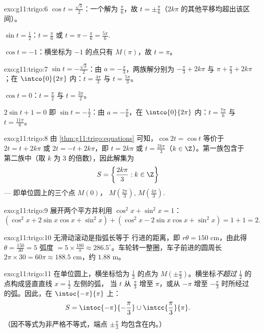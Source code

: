 \begin{solution}{exo:g11:trigo:6}
$\cos t = \frac{\sqrt3}{2}$：一个解为 $\frac\pi6$，故
$t = \pm\frac\pi6$（$2k\pi$ 的其他平移均超出该区间）。

$\sin t = \frac12$：$t = \frac\pi6$ 或 $t = \pi - \frac\pi6 =
\frac{5\pi}{6}$.

$\cos t = -1$：横坐标为 $-1$ 的点只有 $M(\pi)$，故 $t = \pi$。
\end{solution}

\begin{solution}{exo:g11:trigo:7}
$\sin t = -\frac{\sqrt3}{2}$：由 $a = -\frac\pi3$，两族解分别为
$-\frac\pi3 + 2k\pi$ 与 $\pi + \frac\pi3 + 2k\pi$；在
$\intco{0}{2\pi}$ 内：$t = \frac{4\pi}{3}$ 与 $t = \frac{5\pi}{3}$。

$\cos t = 0$：$t = \frac\pi2$ 与 $t = \frac{3\pi}{2}$。

$2\sin t + 1 = 0$ 即 $\sin t = -\frac12$：由 $a = -\frac\pi6$，在
$\intco{0}{2\pi}$ 内：$t = \frac{7\pi}{6}$ 与 $t = \frac{11\pi}{6}$。
\end{solution}

\begin{solution}{exo:g11:trigo:8}
由 \cref{thm:g11:trigo:equations} 可知，$\cos 2t = \cos t$ 等价于
$2t = t + 2k\pi$ 或 $2t = -t + 2k\pi$，即 $t = 2k\pi$ 或
$t = \frac{2k\pi}{3}$（$k \in \Z$）。第一族包含于
第二族中（取 $k$ 为 $3$ 的倍数），因此解集为
\[
S = \left\{\frac{2k\pi}{3} : k \in \Z\right\}
\]
--- 即单位圆上的三个点 $M(0)$，
$M\!\left(\frac{2\pi}{3}\right)$, $M\!\left(\frac{4\pi}{3}\right)$.
\end{solution}

\begin{solution}{exo:g11:trigo:9}
展开两个平方并利用 $\cos^2 x + \sin^2 x = 1$：
\[
(\cos^2 x + 2\sin x\cos x + \sin^2 x)
+ (\cos^2 x - 2\sin x\cos x + \sin^2 x)
= 1 + 1 = 2 .
\]
\end{solution}

\begin{solution}{exo:g11:trigo:10}
无滑动滚动是指弧长等于
行进的距离，即 $r\theta = 150$ cm，由此得
$\theta = \frac{150}{30} = 5$ 弧度 $= 5 \times \frac{180}{\pi} \approx
286.5^\circ$。车轮转一整圈，车子前进的圆周长
$2\pi \times 30 = 60\pi \approx 188.5$ cm，约 $1.88$ m。
\end{solution}

\begin{solution}{exo:g11:trigo:11}
在单位圆上，横坐标恰为 $\frac12$ 的点为
$M\!\left(\pm\frac\pi3\right)$。横坐标\emph{不超过}
$\frac12$ 的点构成竖直直线 $x = \frac12$ 左侧的弧，
当 $t$ 从 $\frac\pi3$ 增至 $\pi$，或从 $-\pi$ 增至
$-\frac\pi3$ 时所经过的弧。因此，在 $\intoc{-\pi}{\pi}$ 上：
\[
S = \intoc{-\pi}{-\frac{\pi}{3}} \cup \intcc{\frac{\pi}{3}}{\pi}.
\]
（因不等式为非严格不等式，端点 $\pm\frac\pi3$ 均包含在内。）
\end{solution}


